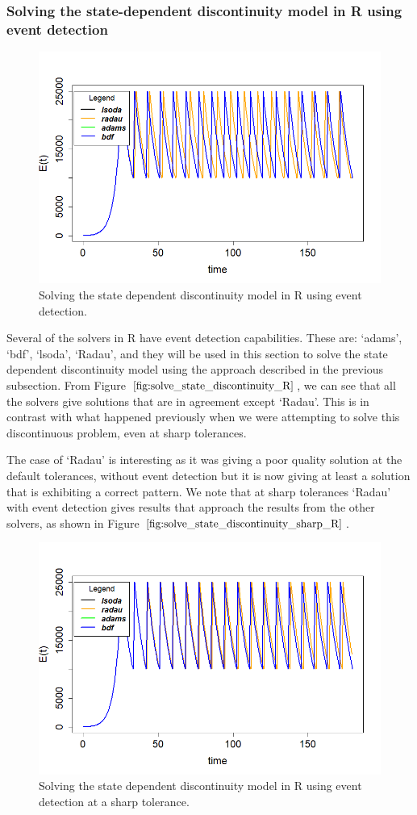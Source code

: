 \subsubsection{Solving the state-dependent discontinuity model in R using event detection}
\begin{figure}[H]
\centering
\includegraphics[width=0.7\linewidth]{./figures/solve_state_discontinuity_R}
\caption{Solving the state dependent discontinuity model in R using event detection.}
\label{fig:solve_state_discontinuity_R}
\end{figure}
Several of the solvers in R have event detection capabilities. These are: `adams', `bdf', `lsoda', `Radau', and they will be used in this section to solve the state dependent discontinuity model using the approach described in the previous subsection. From Figure $\ref{fig:solve_state_discontinuity_R}$, we can see that all the solvers give solutions that are in agreement except `Radau'. This is in contrast with what happened previously when we were attempting to solve this discontinuous problem, even at sharp tolerances. 

The case of `Radau' is interesting as it was giving a poor quality solution at the default tolerances, without event detection but it is now giving at least a solution that is exhibiting a correct pattern. We note that at sharp tolerances `Radau' with event detection gives results that approach the results from the other solvers, as shown in Figure $\ref{fig:solve_state_discontinuity_sharp_R}$.

\begin{figure}[H]
\centering
\includegraphics[width=0.7\linewidth]{./figures/solve_state_discontinuity_sharp_R}
\caption{Solving the state dependent discontinuity model in R using event detection at a sharp tolerance.}
\label{fig:solve_state_discontinuity_sharp_R}
\end{figure}

